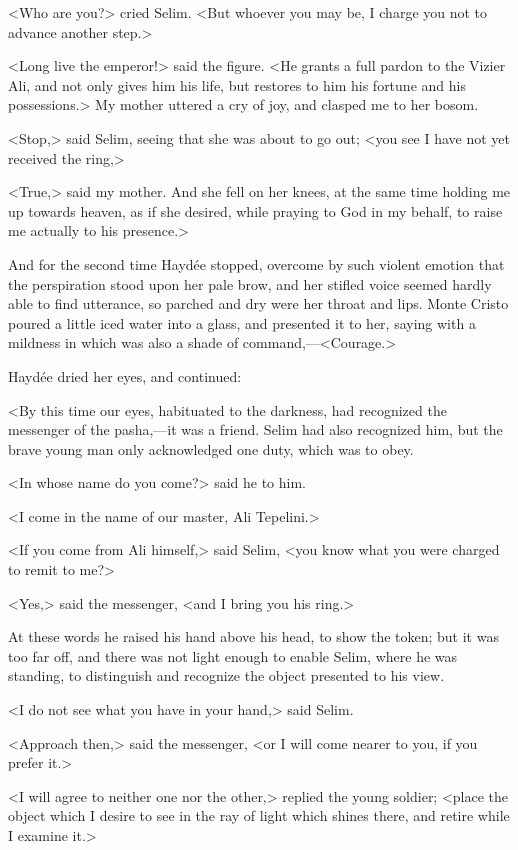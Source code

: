  <Who are you?> cried Selim. <But whoever you may be, I charge you not to advance another step.>
 
 <Long live the emperor!> said the figure. <He grants a full pardon to the Vizier Ali, and not only gives him his life, but restores to him his fortune and his possessions.> My mother uttered a cry of joy, and clasped me to her bosom. 
 
 <Stop,> said Selim, seeing that she was about to go out; <you see I have not yet received the ring,>
 
 <True,> said my mother. And she fell on her knees, at the same time holding me up towards heaven, as if she desired, while praying to God in my behalf, to raise me actually to his presence.> 

 And for the second time Haydée stopped, overcome by such violent emotion that the perspiration stood upon her pale brow, and her stifled voice seemed hardly able to find utterance, so parched and dry were her throat and lips.  Monte Cristo poured a little iced water into a glass, and presented it to her, saying with a mildness in which was also a shade of command,—<Courage.> 

 Haydée dried her eyes, and continued: 

<By this time our eyes, habituated to the darkness, had recognized the messenger of the pasha,—it was a friend. Selim had also recognized him, but the brave young man only acknowledged one duty, which was to obey. 

<In whose name do you come?> said he to him. 

<I come in the name of our master, Ali Tepelini.>

<If you come from Ali himself,> said Selim, <you know what you were charged to remit to me?>

<Yes,> said the messenger, <and I bring you his ring.> 

At these words he raised his hand above his head, to show the token; but it was too far off, and there was not light enough to enable Selim, where he was standing, to distinguish and recognize the object presented to his view. 

<I do not see what you have in your hand,> said Selim. 

<Approach then,> said the messenger, <or I will come nearer to you, if you prefer it.>

<I will agree to neither one nor the other,> replied the young soldier; <place the object which I desire to see in the ray of light which shines there, and retire while I examine it.>

